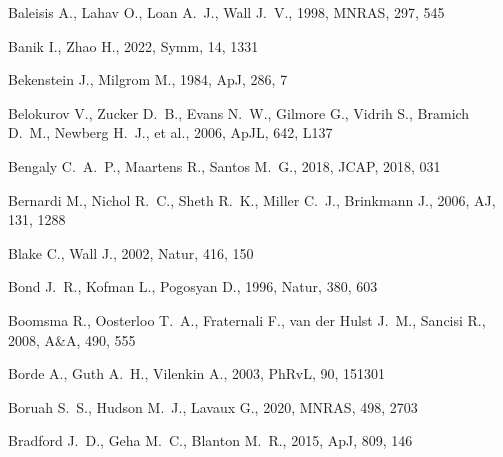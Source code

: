 \documentclass[fleqn,usenatbib]{mnras}
\begin{document}
\begin{thebibliography}{}
 Baleisis A., Lahav O., Loan A.~J., Wall J.~V., 1998, MNRAS, 297, 545

 Banik I., Zhao H., 2022, Symm, 14, 1331


 Bekenstein J., Milgrom M., 1984, ApJ, 286, 7

 Belokurov V., Zucker D.~B., Evans N.~W., Gilmore G., Vidrih S., Bramich D.~M., Newberg H.~J., et al., 2006, ApJL, 642, L137

 Bengaly C.~A.~P., Maartens R., Santos M.~G., 2018, JCAP, 2018, 031


 Bernardi M., Nichol R.~C., Sheth R.~K., Miller C.~J., Brinkmann J., 2006, AJ, 131, 1288

 Blake C., Wall J., 2002, Natur, 416, 150

 Bond J.~R., Kofman L., Pogosyan D., 1996, Natur, 380, 603

 Boomsma R., Oosterloo T.~A., Fraternali F., van der Hulst J.~M., Sancisi R., 2008, A\&A, 490, 555

 Borde A., Guth A.~H., Vilenkin A., 2003, PhRvL, 90, 151301

 Boruah S.~S., Hudson M.~J., Lavaux G., 2020, MNRAS, 498, 2703

 Bradford J.~D., Geha M.~C., Blanton M.~R., 2015, ApJ, 809, 146


\end{thebibliography}
\end{document}
